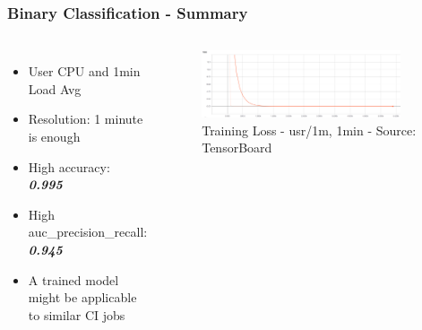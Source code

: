 \documentclass[aspectratio=169,11pt,hyperref={colorlinks=true}]{beamer}
\begin{document}
\begin{frame}
    \frametitle{Binary Classification - Summary}
    \begin{columns}
        \begin{itemize}
            \item{User CPU and 1min Load Avg}
            \item{Resolution: 1 minute is enough}
            \item{High accuracy: \emph{\textbf{0.995}}}
            \item{High auc\_precision\_recall: \emph{\textbf{0.945}}}
            \item{A trained model might be applicable to similar CI jobs}
        \end{itemize}
        \begin{figure}
          \begin{center}
            \includegraphics[width=0.9\textwidth,height=0.5\textheight]{graphs/cpu_1m-1min-status_loss_curve.png}
              \caption{Training Loss - usr/1m, 1min - Source: TensorBoard}
          \end{center}
        \end{figure}
      \end{columns}
\end{frame}
\end{document}
